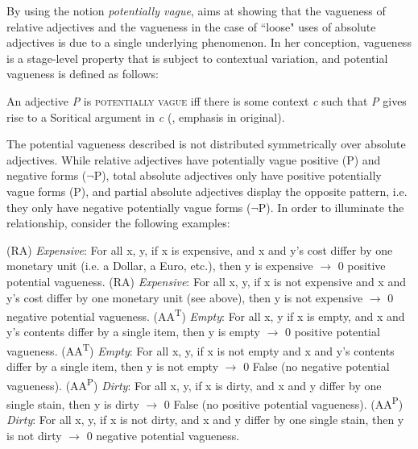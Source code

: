 \documentclass[output=paper]{langsci/langscibook}
\begin{document}
By using the notion \textit{potentially vague}, \textcite[49]{Burnett2017} aims at showing that the vagueness of relative adjectives and the vagueness in the case of ``loose" uses of absolute adjectives is due to a single underlying phenomenon. In her conception, vagueness is a stage-level property that is subject to contextual variation, and potential vagueness is defined as follows:

\ea \label{ex:harris:9}
	An adjective \textit{P} is \textsc{potentially vague} iff there is some context \textit{c} such that \textit{P} gives rise to a Soritical argument in \textit{c} (\textcite[50]{Burnett2017}, emphasis in original). %
\z

The potential vagueness described is not distributed symmetrically over absolute adjectives. While relative adjectives have potentially vague positive (P) and negative forms ($\neg$P), total absolute adjectives only have positive potentially vague forms (P), and partial absolute adjectives display the opposite pattern, i.e. they only have negative potentially vague forms ($\neg$P). In order to illuminate the relationship, consider the following examples: %

\ea \label{ex:harris:10}
	(RA) \textit{Expensive}: For all x, y, if x is expensive, and x and y's cost differ by one monetary unit (i.e. a Dollar, a Euro, etc.), then y is expensive {$\rightarrow$ 0} positive potential vagueness.
	\ex \label{ex:harris:11}
	(RA) \textit{Expensive}: For all x, y, if x is not expensive and x and y's cost differ by one monetary unit (see above), then y is not expensive {$\rightarrow$ 0} negative potential vagueness.
	\ex \label{ex:harris:12}
	(AA\textsuperscript{T}) \textit{Empty}: For all x, y if x is empty, and x and y's contents differ by a single item, then y is empty {$\rightarrow$ 0} positive potential vagueness.
	\ex \label{ex:harris:13}
	(AA\textsuperscript{T}) \textit{Empty}: For all x, y, if x is not empty and x and y's contents differ by a single item, then y is not empty {$\rightarrow$ 0} False (no negative potential vagueness).
	\ex \label{ex:harris:14}
	(AA\textsuperscript{P}) \textit{Dirty}: For all x, y, if x is dirty, and x and y differ by one single stain, then y is dirty {$\rightarrow$ 0} False (no positive potential vagueness).
	\ex \label{ex:harris:15}
	(AA\textsuperscript{P}) \textit{Dirty}: For all x, y, if x is not dirty, and x and y differ by one single stain, then y is not dirty {$\rightarrow$ 0} negative potential vagueness.
\z
\end{document}
